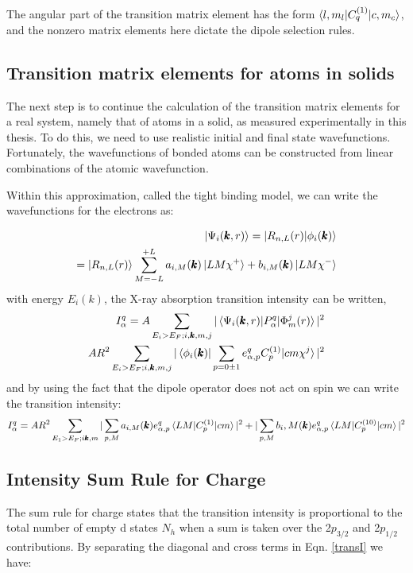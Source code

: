 The angular part of the transition matrix element has the form $\braket{l,m_l|C_q^{(1)}|c,m_c}$, and the nonzero matrix elements here dictate the dipole selection rules.

\subsection{Transition matrix elements for atoms in solids}

The next step is to continue the calculation of the transition matrix elements for a real system, namely that of atoms in a solid, as measured experimentally in this thesis. To do this, we need to use realistic initial and final state wavefunctions. Fortunately, the wavefunctions of bonded atoms can be constructed from linear combinations of the atomic  wavefunction.

Within this approximation, called the tight binding model, we can write the wavefunctions for the electrons as:

\begin{eqnarray}
\ket{\Psi_i(\pmb{k},r)}=\ket{R_{n,L}(r)|\phi_i(\pmb{k})} \\
= \ket{R_{n,L}(r)}\sum^{+L}_{M=-L}a_{i,M}(\pmb{k})\ket{LM\chi^+}+b_{i,M}(\pmb{k})\ket{LM\chi^-}
\end{eqnarray}
with energy $E_i(k)$, the X-ray absorption transition intensity can be written,
\begin{eqnarray}
I_\alpha^q = A\sum_{E_i>E_F; i ,\pmb{k}, m, j} |\braket{\Psi_i(\pmb{k},r)|P_\alpha^q|\Phi_m^j(r)}|^2 \\
A R^2 \sum_{E_i>E_F;i,\pmb{k},m,j}|\braket{\phi_i(\pmb{k})|\sum_{p=0\pm 1}e^q_{\alpha,p}C_p^{(1)}|cm\chi^j}|^2
\end{eqnarray}
and by using the fact that the dipole operator does not act on spin we can write the transition intensity:
\begin{eqnarray}
I_\alpha^q=AR^2\sum_{E_1>E_F; i\pmb{k},m}|\sum_{p,M}a_{i,M}(\pmb{k})e_{\alpha,p}^q\braket{LM|C_p^{(1)}|cm}|^2+|\sum_{p,M}b_i,M(\pmb{k})e^q_{\alpha,p}\braket{LM|C_p^{(10)}|cm}|^2
\label{transI}
\end{eqnarray}

\subsection{Intensity Sum Rule for Charge}

The sum rule for charge states that the transition intensity is proportional to the total number of empty d states $N_h$ when a sum is taken over the 2$p_{3/2}$ and 2$p_{1/2}$ contributions. By separating the diagonal and cross terms in Eqn. \ref{transI} we have:

